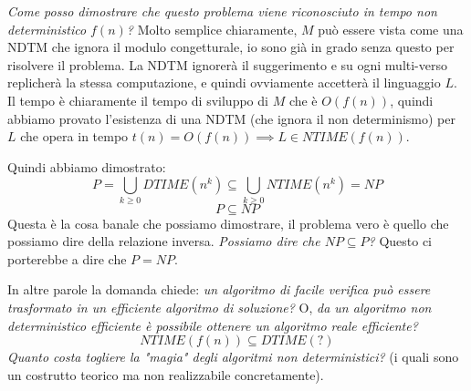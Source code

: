 \documentclass{article}
\begin{document}
\textit{Come posso dimostrare che questo problema viene riconosciuto in
    tempo non deterministico $f(n)$?} Molto semplice chiaramente, $M$ può
essere vista come una NDTM che ignora il modulo congetturale, io sono già in grado
senza questo per risolvere il problema. La NDTM ignorerà il suggerimento e su ogni
multi-verso replicherà la stessa computazione, e quindi ovviamente accetterà il linguaggio
$L$. Il tempo è chiaramente il tempo di sviluppo di $M$ che è $O(f(n))$, quindi
abbiamo provato l'esistenza di una NDTM (che ignora il non
determinismo) per $L$ che opera in tempo $t(n)=O(f(n))\implies L\in NTIME(f(n))$.

Quindi abbiamo dimostrato:
$$P=\bigcup_{k\geq 0}DTIME(n^k)\subseteq \bigcup_{k\geq 0}NTIME(n^k)=NP$$
$$P\subseteq NP$$
Questa è la cosa banale che possiamo dimostrare, il problema vero è quello che possiamo dire
della relazione inversa. \textit{Possiamo dire che $NP\subseteq P$?} Questo ci porterebbe
a dire che $P=NP$.

In altre parole la domanda chiede: \textit{un algoritmo di facile verifica può
    essere trasformato in un efficiente algoritmo di soluzione?} O, \textit{da un algoritmo
    non deterministico efficiente è possibile ottenere un algoritmo
    reale efficiente?}
$$NTIME(f(n))\subseteq DTIME(?)$$
\textit{Quanto costa togliere la "magia" degli algoritmi
    non deterministici?} (i quali sono un costrutto teorico ma non realizzabile concretamente).
\end{document}

